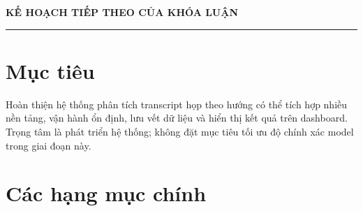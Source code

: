 \documentclass[12pt,a4paper]{article}
\begin{document}
\begin{center}
  {\LARGE\bfseries\color{primaryblue} KẾ HOẠCH TIẾP THEO CỦA KHÓA LUẬN}\vspace{8pt}
\end{center}

\vspace{0.4cm}
\hrule
\vspace{0.4cm}

\section{Mục tiêu}

Hoàn thiện hệ thống phân tích transcript họp theo hướng có thể tích hợp nhiều nền tảng, vận hành ổn định, lưu vết dữ liệu và hiển thị kết quả trên dashboard. Trọng tâm là phát triển hệ thống; không đặt mục tiêu tối ưu độ chính xác model trong giai đoạn này.

\section{Các hạng mục chính}
\end{document}
